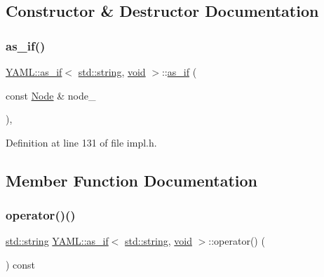 \subsection{Constructor \& Destructor Documentation}
\mbox{\label{struct_y_a_m_l_1_1as__if_3_01std_1_1string_00_01void_01_4_ae073e5c11179a1a68e6f926e08af5622}} 
\subsubsection{\texorpdfstring{as\_if()}{as\_if()}}
{\footnotesize\ttfamily \mbox{\hyperlink{struct_y_a_m_l_1_1as__if}{Y\+A\+M\+L\+::as\+\_\+if}}$<$ \mbox{\hyperlink{glad_8h_ac83513893df92266f79a515488701770}{std\+::string}}, \mbox{\hyperlink{glad_8h_a950fc91edb4504f62f1c577bf4727c29}{void}} $>$\+::\mbox{\hyperlink{struct_y_a_m_l_1_1as__if}{as\+\_\+if}} (\begin{DoxyParamCaption}\item[{const \mbox{\hyperlink{class_y_a_m_l_1_1_node}{Node}} \&}]{node\+\_\+ }\end{DoxyParamCaption})\hspace{0.3cm}{\ttfamily [inline]}, {\ttfamily [explicit]}}



Definition at line 131 of file impl.\+h.



\subsection{Member Function Documentation}
\mbox{\label{struct_y_a_m_l_1_1as__if_3_01std_1_1string_00_01void_01_4_af6b5fe423b03b5397e67424240ed3770}} 
\subsubsection{\texorpdfstring{operator()()}{operator()()}}
{\footnotesize\ttfamily \mbox{\hyperlink{glad_8h_ac83513893df92266f79a515488701770}{std\+::string}} \mbox{\hyperlink{struct_y_a_m_l_1_1as__if}{Y\+A\+M\+L\+::as\+\_\+if}}$<$ \mbox{\hyperlink{glad_8h_ac83513893df92266f79a515488701770}{std\+::string}}, \mbox{\hyperlink{glad_8h_a950fc91edb4504f62f1c577bf4727c29}{void}} $>$\+::operator() (\begin{DoxyParamCaption}{ }\end{DoxyParamCaption}) const\hspace{0.3cm}{\ttfamily [inline]}}



